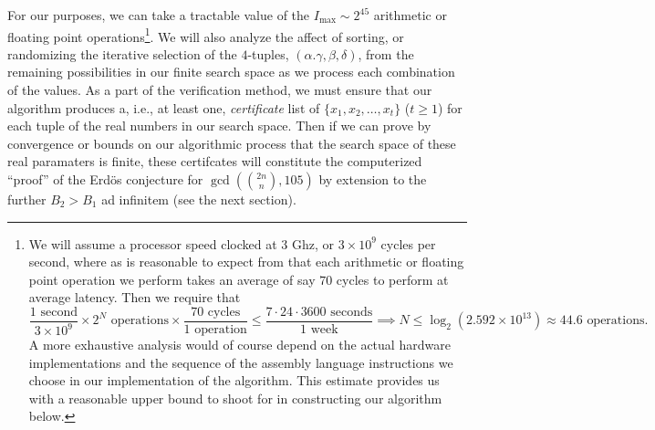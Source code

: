 \documentclass[12pt]{article}
\begin{document}
For our purposes, we can take a tractable value of the $I_{\max} \sim 2^{45}$ arithmetic or floating point 
operations\footnote{ 
     We will assume a processor speed clocked at 3 Ghz, or $3 \times 10^9$ cycles per second, 
     where as is reasonable to expect from 
     \cite{INST-TABLES-REF} that each arithmetic or floating point operation we perform takes an 
     average of say $70$ cycles to perform at average latency. Then we require that 
     \[
     \frac{1\text{ second}}{3 \times 10^9} \times 2^N \text{ operations} \times 
          \frac{70\text{ cycles}}{1\text{ operation}} \leq \frac{7 \cdot 24 \cdot 3600 \text{ seconds}}{ 
          1\text{ week}} \implies 
          N \leq \log_2(2.592 \times 10^{13}) \approx 44.6 \text{ operations}. 
     \] 
     A more exhaustive analysis would of course depend on the actual hardware implementations and the 
     sequence of the assembly language instructions we choose in our implementation of the 
     algorithm. This estimate provides us with a reasonable upper bound to shoot for in 
     constructing our algorithm below. 
}. We will also analyze the affect of sorting, or randomizing the iterative selection of the 
$4$-tuples, $(\alpha.\gamma,\beta,\delta)$, from the remaining possibilities in our finite search space 
as we process each combination of the values. As a part of the verification method, we must ensure that 
our algorithm produces a, i.e., at least one, 
\emph{certificate} list of $\{x_1,x_2,\ldots,x_t\}$ ($t \geq 1$) for each tuple of the real numbers in 
our search space. Then if we can prove by convergence or bounds on our algorithmic process that the 
search space of these real paramaters is finite, these certifcates will constitute the 
computerized ``proof'' of the Erd\"os conjecture for $\gcd(\binom{2n}{n}, 105)$ by extension to the 
further $B_2 > B_1$ ad infinitem (see the next section). 
\end{document}
